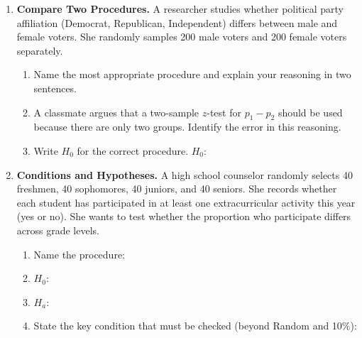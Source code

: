 \documentclass[10pt]{article}
\begin{document}
\begin{enumerate}
\vspace{0.10in}

\item \textbf{Compare Two Procedures.} \;
      A researcher studies whether political party affiliation (Democrat, Republican, Independent)
      differs between male and female voters. She randomly samples 200 male voters and 200 female
      voters separately.

      \begin{enumerate}[label=\alph*.]
        \item Name the most appropriate procedure and explain your reasoning in two sentences.

        \item A classmate argues that a two-sample $z$-test for $p_1 - p_2$ should be used
              because there are only two groups. Identify the error in this reasoning.

        \item Write $H_0$ for the correct procedure.
              $H_0$: 
      \end{enumerate}

\vspace{0.10in}

\item \textbf{Conditions and Hypotheses.} \;
      A high school counselor randomly selects 40 freshmen, 40 sophomores, 40 juniors, and
      40 seniors. She records whether each student has participated in at least one extracurricular
      activity this year (yes or no). She wants to test whether the proportion who participate
      differs across grade levels.

      \begin{enumerate}[label=\alph*.]
        \item Name the procedure: 
        \item $H_0$: 
        \item $H_a$: 
        \item State the key condition that must be checked (beyond Random and 10\%): 
      \end{enumerate}

\end{enumerate}
\end{document}
